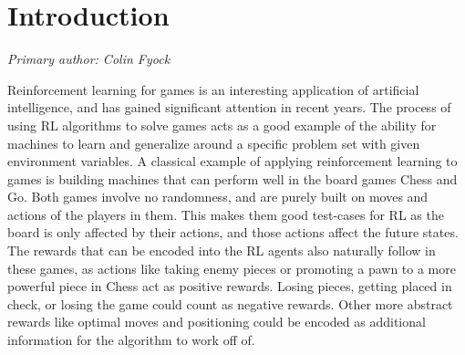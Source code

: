 \documentclass[article, 10pt]{IEEEtran}
\begin{document}
\section{Introduction}\label{sec:1_introduction}

\textit{Primary author: Colin Fyock}

Reinforcement learning for games is an interesting application of artificial intelligence, and has gained significant attention in recent years. The process of using RL algorithms to solve games acts as a good example of the ability for machines to learn and generalize around a specific problem set with given environment variables. A classical example of applying reinforcement learning to games is building machines that can perform well in the board games Chess and Go. Both games involve no randomness, and are purely built on moves and actions of the players in them. This makes them good test-cases for RL as the board is only affected by their actions, and those actions affect the future states. The rewards that can be encoded into the RL agents also naturally follow in these games, as actions like taking enemy pieces or promoting a pawn to a more powerful piece in Chess act as positive rewards. Losing pieces, getting placed in check, or losing the game could count as negative rewards. Other more abstract rewards like optimal moves and positioning could be encoded as additional information for the algorithm to work off of.
\end{document}
